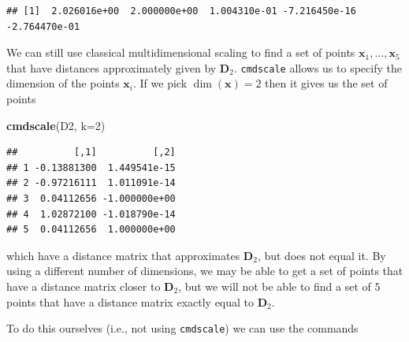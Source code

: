 \documentclass[]{book}
\newenvironment{Shaded}{\begin{snugshade}}{\end{snugshade}}
\newcommand{\DataTypeTok}[1]{\textcolor[rgb]{0.13,0.29,0.53}{#1}}
\newcommand{\DecValTok}[1]{\textcolor[rgb]{0.00,0.00,0.81}{#1}}
\newcommand{\FloatTok}[1]{\textcolor[rgb]{0.00,0.00,0.81}{#1}}
\newcommand{\KeywordTok}[1]{\textcolor[rgb]{0.13,0.29,0.53}{\textbf{#1}}}
\newcommand{\NormalTok}[1]{#1}
\newcommand{\OperatorTok}[1]{\textcolor[rgb]{0.81,0.36,0.00}{\textbf{#1}}}
\newcommand{\StringTok}[1]{\textcolor[rgb]{0.31,0.60,0.02}{#1}}
\theoremstyle{definition}
\theoremstyle{definition}
\theoremstyle{definition}
\theoremstyle{remark}
\begin{document}
\begin{Shaded}
\end{Shaded}

\begin{verbatim}
## [1]  2.026016e+00  2.000000e+00  1.004310e-01 -7.216450e-16 -2.764470e-01
\end{verbatim}

We can still use classical multidimensional scaling to find a set of points \(\mathbf x_1, \ldots, \mathbf x_5\) that have distances approximately given by \(\mathbf D_2\).
\texttt{cmdscale} allows us to specify the dimension of the points \(\mathbf x_i\). If we pick \(\dim(\mathbf x)=2\) then it gives us the set of points

\begin{Shaded}
\begin{Highlighting}[]
\KeywordTok{cmdscale}\NormalTok{(D2, }\DataTypeTok{k=}\DecValTok{2}\NormalTok{)}
\end{Highlighting}
\end{Shaded}

\begin{verbatim}
##          [,1]          [,2]
## 1 -0.13881300  1.449541e-15
## 2 -0.97216111  1.011091e-14
## 3  0.04112656 -1.000000e+00
## 4  1.02872100 -1.018790e-14
## 5  0.04112656  1.000000e+00
\end{verbatim}

which have a distance matrix that approximates \(\mathbf D_2\), but does not equal it. By using a different number of dimensions, we may be able to get a set of points that have a distance matrix closer to \(\mathbf D_2\), but we will not be able to find a set of \(5\) points that have a distance matrix exactly equal to \(\mathbf D_2\).

To do this ourselves (i.e., not using \texttt{cmdscale}) we can use the commands
\end{document}
